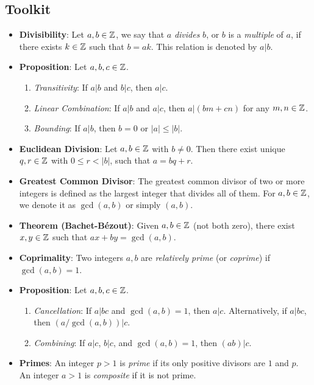 \documentclass[12pt]{memoir}
\begin{document}
\subsection*{Toolkit}

\begin{itemize}
    \item \textbf{Divisibility}: Let \(a, b \in \mathbb{Z}\), we say that \(a\) \emph{divides} \(b\), or \(b\) is a \emph{multiple} of \(a\), if there exists \(k \in \mathbb{Z}\) such that \(b = ak\). This relation is denoted by \(a|b\).
    \item \textbf{Proposition}: Let \(a, b, c \in \mathbb{Z}\).
    \begin{enumerate}
        \item \emph{Transitivity}: If \(a|b\) and \(b|c\), then \(a|c\).
        \item \emph{Linear Combination}: If \(a|b\) and \(a|c\), then \(a|(bm + cn)\) for any \(m, n \in \mathbb{Z}\).
        \item \emph{Bounding}: If \(a|b\), then \(b = 0\) or \(|a| \leq |b|\).
    \end{enumerate}
    \item \textbf{Euclidean Division}: Let \(a, b \in \mathbb{Z}\) with \(b \neq 0\). Then there exist unique \(q, r \in \mathbb{Z}\) with \(0 \leq r < |b|\), such that \(a = bq + r\).
    \item \textbf{Greatest Common Divisor}: The greatest common divisor of two or more integers is defined as the largest integer that divides all of them. For \(a, b \in \mathbb{Z}\), we denote it as \(\gcd(a, b)\) or simply \((a, b)\).
    \item \textbf{Theorem (Bachet-B\'{e}zout)}: Given \(a, b \in \mathbb{Z}\) (not both zero), there exist \(x, y \in \mathbb{Z}\) such that \(ax + by = \gcd(a, b)\).
    \item \textbf{Coprimality}: Two integers \(a, b\) are \emph{relatively prime} (or \emph{coprime}) if \(\gcd(a, b) = 1\).
    \item \textbf{Proposition}: Let \(a, b, c \in \mathbb{Z}\).
    \begin{enumerate}
        \item \emph{Cancellation}: If \(a|bc\) and \(\gcd(a, b) = 1\), then \(a|c\). Alternatively, if \(a|bc\), then \((a / \gcd(a, b)) | c\).
        \item \emph{Combining}: If \(a|c\), \(b|c\), and \(\gcd(a, b) = 1\), then \((ab)|c\).
    \end{enumerate}
    \item \textbf{Primes}: An integer \(p > 1\) is \emph{prime} if its only positive divisors are \(1\) and \(p\). An integer \(a > 1\) is \emph{composite} if it is not prime.

\end{itemize}
\end{document}
